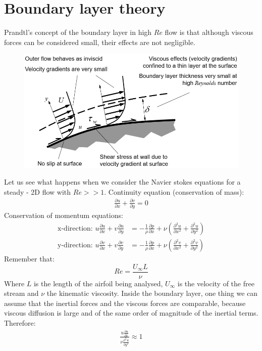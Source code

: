 \documentclass[class=report, crop=false, 12pt,a4paper]{standalone}
\begin{document}
\section{Boundary layer theory}
Prandtl's concept of the boundary layer in high $Re$ flow is that although viscous forces can be considered small, their effects are not negligible.
\begin{figure}[H]
  \centering
  \includegraphics[width = 0.8 \textwidth]{../img/diagram50.png}
\end{figure}
Let us see what happens when we consider the Navier stokes equations for a steady - 2D flow with $Re >> 1$. Continuity equation (conservation of mass):
\begin{align}
  \frac{\partial u}{\partial x} + \frac{\partial v}{\partial y} = 0
\end{align}
Conservation of momentum equations:
\begin{align}
  \textrm{x-direction: } u\frac{\partial u}{\partial x} + v \frac{\partial u }{\partial y} &= - \frac{1}{\rho} \frac{\partial p}{\partial x} + \nu \left(\frac{\partial^2 u}{\partial x^2} + \frac{\partial^2 u}{\partial y^2}\right)\\
  \textrm{y-direction: } u \frac{\partial v}{\partial x} + v\frac{\partial v}{\partial y} &= -\frac{1}{\rho}\frac{\partial p}{\partial x} + \nu \left(\frac{\partial^2 v}{\partial x^2} + \frac{\partial^2 v}{\partial y^2}\right)
\end{align}
Remember that:
\begin{equation}
  Re = \frac{U_\infty L}{\nu}
\end{equation}
Where $L$ is the length of the airfoil being analysed, $U_\infty$ is the velocity of the free stream and $\nu$ the kinematic viscosity. Inside the boundary layer, one thing we can assume that the inertial forces and the viscous forces are comparable, because viscous diffusion is large and of the same order of magnitude of the inertial terms. Therefore:
\begin{align}
  \frac{u\frac{\partial u}{\partial x}}{\nu \frac{\partial^2 u}{\partial y^2}} \approx 1
\end{align}
\end{document}
